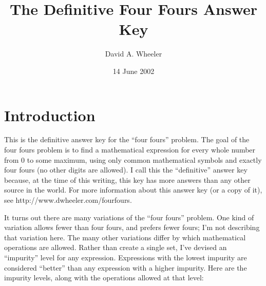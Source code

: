 \documentclass[twocolumn,twoside,draft,american]{report}
\title{The Definitive Four Fours Answer Key}
\author{David A. Wheeler}
\date{14 June 2002}
\begin{document}
\maketitle


\chapter{Introduction}

This is the definitive answer key for the ``four fours'' problem.
The goal of the four fours problem is to find a mathematical expression
for every whole number from 0 to some maximum, using only common mathematical
symbols and exactly four fours (no other digits are allowed).
I call this the ``definitive'' answer key because, at the time of this
writing, this key has more answers than any other source in the world.
For more information about this answer key (or a copy of it),
see http://www.dwheeler.com/fourfours.

It turns out there are many variations of the ``four fours'' problem.
One kind of variation allows fewer than four fours, and prefers fewer fours;
I'm not describing that variation here.
The many other variations differ by which mathematical operations are allowed.
Rather than create a single set,
I've devised an ``impurity'' level for any expression.
Expressions with the lowest impurity are considered ``better'' than any
expression with a higher impurity.  Here are the impurity levels, along with
the operations allowed at that level:
\end{document}
